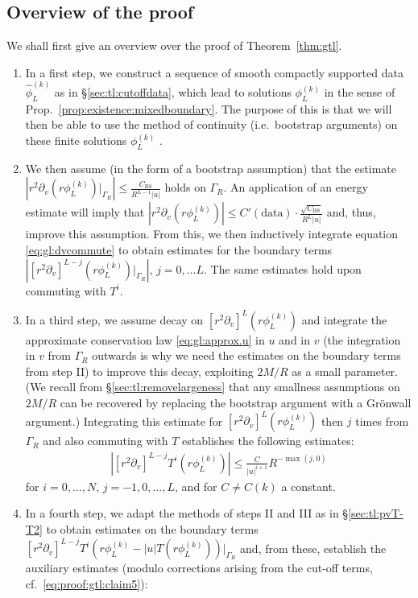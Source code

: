 \documentclass[11pt,english]{article}
\numberwithin{equation}{section}
\theoremstyle{remark}
\theoremstyle{plain}
\theoremstyle{remark}
\renewcommand{\labelenumi}{\alph{enumi}.} %
\newcommand{\pv}{\partial_v}
\renewcommand{\(}{\left(}
\renewcommand{\)}{\right)}
\begin{document}
\subsection{Overview of the proof}\label{sec:tl:overviewofproof}
\newcommand{\pvx}[1]{[r^2\pv]^{#1}}
We shall first give an overview over the proof of Theorem~\ref{thm:gtl}. 
 \renewcommand{\labelenumi}{\Roman{enumi}}
\begin{enumerate}
\item 
In a first step, we construct a sequence of smooth compactly supported data $\hat{\phi}^{(k)}_L$ as in \S \ref{sec:tl:cutoffdata}, which lead to solutions $\phi_L^{(k)}$ in the sense of Prop.~\ref{prop:existence:mixedboundary}. The purpose of this is that we will then be able to use the method of continuity (i.e.\ bootstrap arguments) on these finite solutions $\phi_L^{(k)}$ .
\item 
We then assume (in the form of a bootstrap assumption) that the estimate $\left|r^2\pv(r\phi^{(k)}_L)|_{\Gamma_R}\right|\leq \frac{C_{\mathrm{BS}}}{R^{L-1}|u|}$ holds on $\Gamma_R$. 
An application of an energy estimate will imply that $\left|r^2\pv(r\phi^{(k)}_L)\right|\leq C'(\mathrm{data})\cdot \frac{\sqrt{ C_{\mathrm{BS}}}}{R^L|u|}$ and, thus, improve this assumption.
 From this, we then inductively integrate equation \eqref{eq:gl:dvcommute} to obtain estimates for the boundary terms $\left|[r^2\pv]^{L-j}(r\phi^{(k)}_L)|_{\Gamma_R}\right|$, $j=0,\dots L$. 
 The same estimates hold upon commuting with $T^i$.
\item 
In a third step, we assume decay on $[r^2\pv]^{L}(r\phi^{(k)}_L)$ and integrate the approximate conservation law \eqref{eq:gl:approx.u} in $u$ and in $v$ (the integration in $v$ from $\Gamma_R$ outwards is why we need the estimates on the boundary terms from step II) to improve this decay, exploiting $2M/R$ as a small parameter. 
(We recall from \S \ref{sec:tl:removelargeness} that any smallness assumptions on $2M/R$ can be recovered by replacing the bootstrap argument with a Gr\"onwall argument.)
Integrating this estimate for $[r^2\pv]^{L}(r\phi^{(k)}_L)$ then $j$ times from $\Gamma_R$ and also commuting with $T$ establishes the following estimates:
\begin{align}\label{eq:gtl:overview3}
\left|[r^2\pv]^{L-j}T^i(r\phi^{(k)}_L)\right|\leq \frac{C}{|u|^{i+1}}R^{-\max{(j,0)}}
\end{align}
for $i=0,\dots, N$, $j=-1,0,\dots, L$, and for $C\neq C(k)$ a constant.
\item 
In a fourth step, we adapt the methods of steps II and III as in \S \ref{sec:tl:pvT-T2} to obtain estimates on the boundary terms $[r^2\pv]^{L-j}T^i (r\phi^{(k)}_L-|u| T(r\phi^{(k)}_L))|_{\Gamma_R}$ and, from these, establish the auxiliary estimates (modulo corrections arising from the cut-off terms, cf.\ \eqref{eq:proof:gtl:claim5}):

\end{enumerate}
\end{document}
